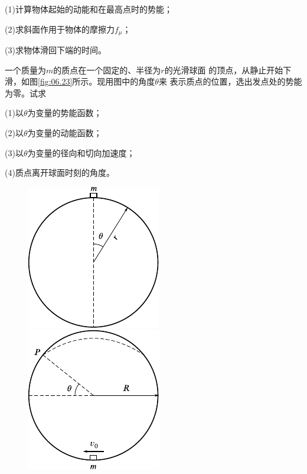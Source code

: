 \begin{exercises}
\clearpage
(1)计算物体起始的动能和在最高点时的势能；

(2)求斜面作用于物体的摩擦力$ f _ { \mu } $；

(3)求物体滑回下端的时间。

\exercise 一个质量为$ m $的质点在一个固定的、半径为$ r $的光滑球面
的顶点，从静止开始下滑，如图\ref{fig:06.23}\;所示。现用图中的角度$ \theta $来
表示质点的位置，选出发点处的势能为零。试求

(1)以$ \theta $为变量的势能函数；

(2)以$ \theta $为变量的动能函数；

(3)以$ \theta $为变量的径向和切向加速度；

(4)质点离开球面时刻的角度。
\begin{figure}[h]
  \begin{minipage}[b]{0.5\linewidth}
    \centering
    \includegraphics{figure/fig06.23}
    \caption{}
    \label{fig:06.23}
  \end{minipage}
  \hfill
  \begin{minipage}[b]{0.5\linewidth}
    \centering
    \includegraphics{figure/fig06.24}
    \caption{}
    \label{fig:06.24}
  \end{minipage}
\vspace{-0.8em}
\end{figure}


\end{exercises}
